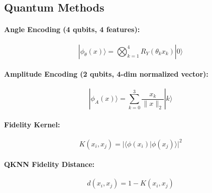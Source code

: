 \documentclass[12pt,a4paper]{article}
\begin{document}
\subsection{Quantum Methods}
\paragraph{Angle Encoding (4 qubits, 4 features):}
\begin{equation}
  |\phi_\theta(x)\rangle = \bigotimes_{k=1}^{4} R_Y(\theta_k x_k)|0\rangle
\end{equation}

\paragraph{Amplitude Encoding (2 qubits, 4-dim normalized vector):}
\begin{equation}
  |\phi_A(x)\rangle = \sum_{k=0}^{3} \frac{x_k}{\|x\|_2}|k\rangle
\end{equation}

\paragraph{Fidelity Kernel:}
\begin{equation}
  K(x_i, x_j) = |\langle\phi(x_i)|\phi(x_j)\rangle|^2
\end{equation}

\paragraph{QKNN Fidelity Distance:}
\begin{equation}
  d(x_i, x_j) = 1 - K(x_i, x_j)
\end{equation}

\end{document}

